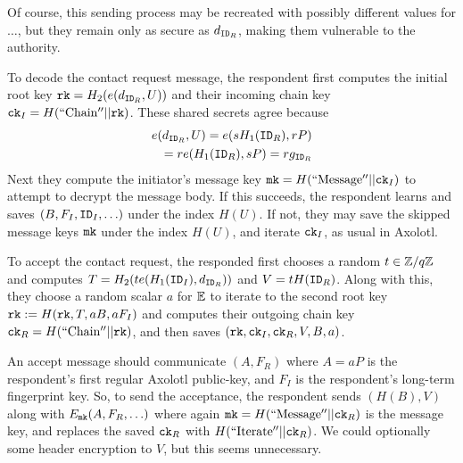 \documentclass[twoside,letterpaper]{sig-alternate}
\begin{document}
Of course, this sending process may be recreated with possibly different
values for $\ldots$, but they remain only as secure as $d_{\mathtt{ID}_R}$,
making them vulnerable to the authority.

\smallskip

To decode the contact request message, the respondent 
first computes the initial root key $\mathtt{rk} = H_2( e(d_{\mathtt{ID}_R}, U) )$
and their incoming chain key $\mathtt{ck}_I = H(\mathrm{``Chain''} || \mathtt{rk})$.
These shared secrets agree because 
\begin{align*}
e(d_{\mathtt{ID}_R}, U) = e(s H_1(\mathtt{ID}_R), r P) \\ 
 \quad = r e(H_1(\mathtt{ID}_R), s P) = r g_{\mathtt{ID}_R}
\end{align*}
Next they compute the initiator's
 message key $\mathtt{mk} = H(\mathrm{``Message''}  || \mathtt{ck}_I)$ 
to attempt to decrypt the message body.
If this succeeds, the respondent learns and saves $(B,F_I,\mathtt{ID}_I,\ldots)$
 under the index $H(U)$.
If not, they may save the skipped message keys $\mathtt{mk}$ under
the index $H(U)$, and iterate $\mathtt{ck}_I$, as usual in Axolotl.

To accept the contact request,
the responded first chooses a random $t \in \mathbb{Z}/q\mathbb{Z}$ and 
 computes $T = H_2( t e(H_1(\mathtt{ID}_I),d_{\mathtt{ID}_R}) )$ and $V = t H(\mathtt{ID}_R)$.
Along with this, they choose a random scalar $a$ for $\mathbb{E}$ to
iterate to the second root key $\mathtt{rk} := H(\mathtt{rk}, T, a B, a F_I)$ and
 computes their outgoing chain key $\mathtt{ck}_R = H(\mathrm{``Chain''} || \mathtt{rk})$,
and then saves $(\mathtt{rk},\mathtt{ck}_I,\mathtt{ck}_R,V,B,a)$. 

An accept message should communicate $(A,F_R)$ where 
 $A = a P$ is the respondent's first regular Axolotl public-key, and
 $F_I$ is the respondent's long-term fingerprint key.
So, to send the acceptance, the respondent
sends $(H(B),V)$ along with $E_{\mathtt{mk}}(A,F_R,\ldots)$ where again
 $\mathtt{mk} = H(\mathrm{``Message''}  || \mathtt{ck}_R)$ is the message key,
and replaces the saved $\mathtt{ck}_R$ with $H(\mathrm{``Iterate''} || \mathtt{ck}_R)$.
We could optionally some header encryption to $V$, but this seems unnecessary.

\smallskip
\end{document}
